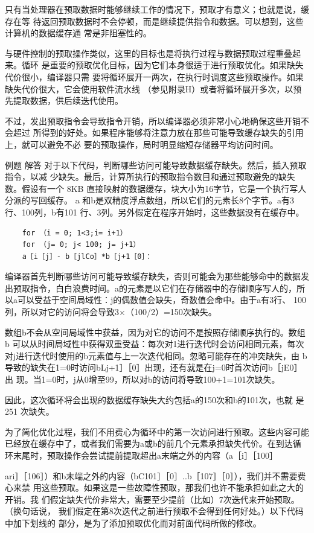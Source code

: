只有当处理器在预取数据时能够继续工作的情况下，预取才有意义；也就是说，缓存在等
待返回预取数据时不会停顿，而是继续提供指令和数据。可以想到，这些计算机的数据缓存通
常是非阻塞性的。

与硬件控制的预取操作类似，这里的目标也是将执行过程与数据预取过程重叠起来。循环
是重要的预取优化目标，因为它们本身很适于进行预取优化。如果缺失代价很小，编译器只需
要将循环展开一两次，在执行时调度这些预取操作。如果缺失代价很大，它会使用软件流水线
（参见附录H）或者将循环展开多次，以预先提取数据，供后续迭代使用。

不过，发出预取指令会导致指令开销，所以编译器必须非常小心地确保这些开销不会超过
所得到的好处。如果程序能够将注意力放在那些可能导致缓存缺失的引用上，就可以避免不必
要的预取操作，局时明显缩短存储器平均访问时间。

例题
解答
对于以下代码，判断哪些访问可能导致数据缓存缺失。然后，插入预取指令，以减
少缺失。最后，计算所执行的预取指令数目和通过预取避免的缺失数。假设有一个
8KB 直接映射的数据缓存，块大小为16字节，它是一个执行写人分派的写回缓存。
a 和b是双精度浮点数组，所以它们的元素长8个字节。a有3行、100列，b有101
行、3列。另外假定在程序开始时，这些数据没有在缓存中。
\begin{verbatim}
    for （i = 0; 1<3;i= i+1）
    for （j= 0; j< 100; j= j+1）
    a［i［j］- b［jlCo］*b［j+1［0］：
\end{verbatim}
编译器首先判断哪些访问可能导致缓存缺失，否则可能会为那些能够命中的数据发
出预取指令，白白浪费时间。a的元素是以它们在存储器中的存储顺序写人的，所
以a可以受益于空间局域性：j的偶数值会缺失，奇数值会命中。由于a有3行、
100列，所以对它的访问将会导致3×（100/2）=150次缺失。

数组b不会从空间局域性中获益，因为对它的访问不是按照存储顺序执行的。数组
b 可以从时间局域性中获得双重受益：每次对1进行迭代时会访问相同元素，每次
对j进行迭代时使用的b元素值与上一次迭代相同。忽略可能存在的冲突缺失，由
b导致的缺失在1=0时访问bLj+1］［0］出现，还有就是在j=0时首次访问b［jE0］出
现。当1=0时，j从0增至99，所以对b的访问将导致100+1=101次缺失。

因此，这次循环将会出现的数据缓存缺失大约包括a的150次和b的101次，也就
是251 次缺失。

为了简化优化过程，我们不用费心为循环中的第一次访问进行预取。这些内容可能
已经放在缓存中了，或者我们需要为a或b的前几个元素承担缺失代价。在到达循
环末尾时，预取操作会尝试提前提取超出a末端之外的内容（a［i］［100］

ari］［106］）和b末端之外的内容（bC101］［0］..b［107］［0］），我们并不需要费心来禁
用这些预取。如果这是一些故障性预取，那我们也许不能承担如此之大的开销。我
们假定缺失代价非常大，需要至少提前（比如）7次迭代来开始预取。（换句话说，
我们假定在第8次迭代之前进行预取不会得到任何好处。）以下代码中加下划线的
部分，是为了添加预取优化而对前面代码所做的修改。


